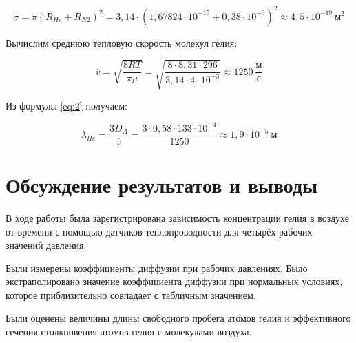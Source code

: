 \documentclass[a4paper,12pt]{article}
\begin{document}
\begin{equation}
    \sigma = \pi \left( R_{He} + R_{N2} \right)^2 = 3,14 \cdot \left( 1,67824 \cdot 10^{-15} + 0,38 \cdot 10^{-9} \right)^2 \approx 4,5 \cdot 10^{-19} \ \text{м}^2
\end{equation}

Вычислим среднюю тепловую скорость молекул гелия:

\begin{equation*}
    \overline{v} = \sqrt{\frac{8RT}{\pi \mu}} = \sqrt{\frac{8 \cdot 8,31 \cdot 296}{3,14 \cdot 4 \cdot 10^{-3}}} \approx 1250 \ \frac{\text{м}}{\text{с}}
\end{equation*}

Из формулы \eqref{eq:2} получаем:

\begin{equation*}
    \lambda_{He} = \frac{3D_A}{\overline{v}} = \frac{3 \cdot 0,58 \cdot 133 \cdot 10^{-4}}{1250} \approx 1,9 \cdot 10^{-5} \ \text{м}
\end{equation*}

\section{Обсуждение результатов и выводы}

В ходе работы была зарегистрирована зависимость концентрации гелия в воздухе от времени с помощью датчиков теплопроводности для четырёх рабочих значений давления.

Были измерены коэффициенты диффузии при рабочих давлениях. Было экстраполировано значение коэффициента диффузии при нормальных условиях, которое приблизительно совпадает с табличным значением.

Были оценены величины длины свободного пробега атомов гелия  и эффективного сечения столкновения атомов гелия с молекулами воздуха.
\end{document}

